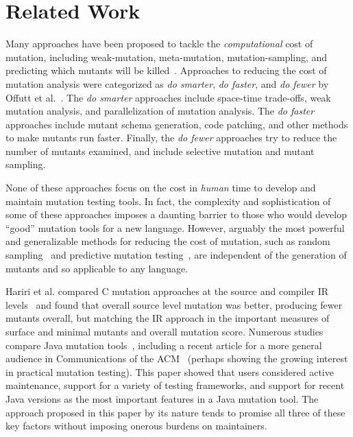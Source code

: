 \documentclass[sigconf,review, anonymous]{acmart}
\begin{document}
\section{Related Work}

Many approaches have been proposed to tackle the \emph{computational} cost of mutation, including weak-mutation, 
meta-mutation, mutation-sampling, and predicting which mutants will be
killed~\cite{offuttMutant1996,
  untch1993mutation,KaufmanFAKAJ2022,zhang2016pmt}.  Approaches to reducing the cost of
mutation analysis were categorized as \textit{do smarter}, \textit{do
faster}, and \textit{do fewer} by Offutt et al.~\cite{offutt2001mutation}.
The \textit{do smarter} approaches include space-time trade-offs, weak
mutation analysis, and parallelization of mutation analysis. The \textit{do
faster} approaches include mutant schema generation, code patching, and
other methods to make mutants run faster. Finally, the
\textit{do fewer} approaches try to reduce the number of mutants examined,
and include selective mutation and mutant sampling.

None of these approaches focus on the cost in \emph{human} time to
develop and maintain mutation testing tools.  In fact, the complexity
and sophistication of some of these approaches imposes a daunting
barrier to those who would develop ``good'' mutation tools for a new
language.  However, arguably the most powerful and generalizable
methods for reducing the cost of mutation, such as random sampling~\cite{GopinathSampleSize,gopinath2017mutation} and
predictive mutation testing~\cite{zhang2016pmt,kim2022predictive}, are independent of the generation of
mutants and so applicable to any language.

Hariri et al. compared C mutation approaches at the source and
compiler IR levels~\cite{CompareSrcBinary} and found that overall
source level mutation was better, producing fewer mutants overall, but
matching the IR approach in the important measures of surface and
minimal mutants and overall mutation score.  Numerous studies compare
Java mutation tools~\cite{MajorPIT,gopinath2017does}, including a
recent article for a more general audience in Communications of the
ACM~\cite{CommACMJavaTool} (perhaps showing the growing interest in
practical mutation testing).  This paper showed that users
considered active maintenance, support for a variety of testing
frameworks, and support for recent Java versions as the most important
features in a Java mutation tool.  The approach proposed in this paper
by its nature tends to promise all three of these key factors without
imposing onerous burdens on maintainers.
\end{document}
